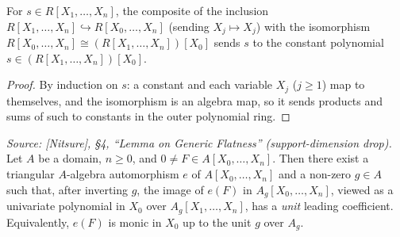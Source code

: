 \begin{lemma}
  \label{lem:gf_finSuccEquiv_rename_succ}
  For \(s \in R[X_1, \dots, X_n]\), the composite of the inclusion
  \(R[X_1, \dots, X_n] \hookrightarrow R[X_0, \dots, X_n]\) (sending \(X_j \mapsto X_j\))
  with the isomorphism \(R[X_0, \dots, X_n] \cong (R[X_1, \dots, X_n])[X_0]\) sends \(s\)
  to the constant polynomial \(s \in (R[X_1, \dots, X_n])[X_0]\).
\end{lemma}
\begin{proof}

\leanok
  By induction on \(s\): a constant and each variable \(X_j\) (\(j \ge 1\)) map to themselves,
  and the isomorphism is an algebra map, so it sends products and sums of such to constants in
  the outer polynomial ring.
\end{proof}

\begin{lemma}
  \label{lem:gf_nagata_monic_lastVar}
  \textit{Source: [Nitsure], \S4, ``Lemma on Generic Flatness'' (support-dimension drop).}
  Let \(A\) be a domain, \(n \ge 0\), and \(0 \ne F \in A[X_0, \dots, X_n]\). Then there
  exist a triangular \(A\)-algebra automorphism \(e\) of \(A[X_0, \dots, X_n]\) and a
  non-zero \(g \in A\) such that, after inverting \(g\), the image of \(e(F)\) in
  \(A_g[X_0, \dots, X_n]\), viewed as a univariate polynomial in \(X_0\) over
  \(A_g[X_1, \dots, X_n]\), has a \emph{unit} leading coefficient. Equivalently, \(e(F)\)
  is monic in \(X_0\) up to the unit \(g\) over \(A_g\).
\end{lemma}


